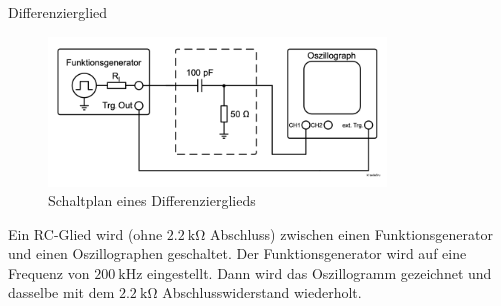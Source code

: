 \documentclass[ngerman]{scrartcl}
\theoremstyle{definition}
\begin{document}
		\begin{aufgabe}{Differenzierglied}
			\aufbau
			\begin{figure}[H]
				\centering
				\includegraphics[width=0.8\textwidth]{figs/Aufbau_1_1_Differenzierglied.png}
				\caption{Schaltplan eines Differenzierglieds~\cite{anleitung}}
				\label{fig:aufbau_1_1_differenzierglied}
			\end{figure}
			Ein RC-Glied wird (ohne $\SI{2.2}{\kilo\ohm}$ Abschluss) zwischen einen Funktionsgenerator und einen Oszillographen geschaltet. Der Funktionsgenerator wird auf eine Frequenz von $\SI{200}{\kilo\hertz}$ eingestellt. Dann wird das Oszillogramm gezeichnet und dasselbe mit dem $\SI{2.2}{\kilo\ohm}$ Abschlusswiderstand wiederholt.
			\messwerte
			

\end{aufgabe}
\end{document}

